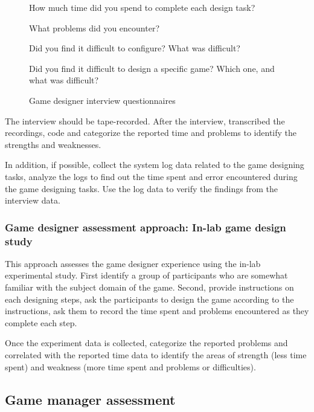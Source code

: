 \documentclass[11pt,oneside]{book}
\begin{document}
\begin{figure}[ht!]
\begin{mybox}
\begin{compactenum}
\item How much time did you spend to complete each design task?
\item What problems did you encounter?
\item Did you find it difficult to configure? What was difficult?
\item Did you find it difficult to design a specific game? Which one, and what was difficult?
\end{compactenum}
\end{mybox}
\caption{Game designer interview questionnaires}
\label{fig:game-designer-interview}  
\end{figure}

The interview should be tape-recorded. After the interview, transcribed the recordings, code and categorize the reported 
time and problems to identify the strengths and weaknesses.

In addition, if possible, collect the system log data related to the game designing tasks, analyze the logs to find out the time 
spent and error encountered during the game designing tasks. Use the log data to verify the findings from the interview data.

\subsubsection{Game designer assessment approach: In-lab game design study}
\label{In-lab game design study}

This approach assesses the game designer experience using the in-lab experimental study.  First identify a group 
of participants who are somewhat familiar with the subject domain of the game. Second, provide instructions on 
each designing steps, ask the participants to design the game according to the instructions, ask them to record 
the time spent and problems encountered as they complete each step.

Once the experiment data is collected, categorize the reported problems and correlated with the reported time data 
to identify the areas of strength (less time spent) and weakness (more time spent and problems or difficulties). 

\subsection{Game manager assessment}
\end{document}
